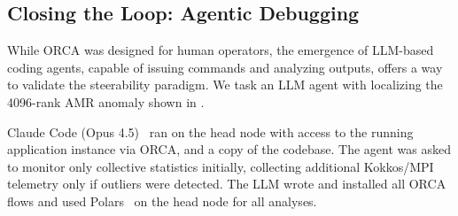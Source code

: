 
\subsection{Closing the Loop: Agentic Debugging}\label{sec:orca:eval-agent}

While ORCA was designed for human operators, the emergence of LLM-based coding agents, capable of
issuing commands and analyzing outputs, offers a way to validate the steerability paradigm.
We task an LLM agent with localizing the 4096-rank AMR anomaly 
shown in .



Claude Code (Opus 4.5)~\cite{:ClaudeCode} ran on the head node with access to the running
application instance via ORCA, and a copy of the codebase.
The agent was asked to monitor only collective statistics initially, collecting additional
Kokkos/MPI telemetry only if outliers were detected.
The LLM wrote and installed all ORCA flows and used Polars~\cite{:Polars} on the head node for all
analyses.
\figEvalAgentic{}

